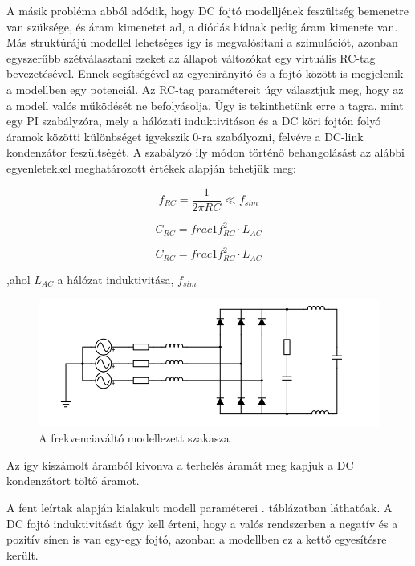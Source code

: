 A másik probléma abból adódik, hogy DC fojtó modelljének feszültség bemenetre van szüksége, és áram kimenetet ad, a diódás hídnak pedig áram kimenete van. Más struktúrájú modellel lehetséges így is megvalósítani a szimulációt, azonban egyszerűbb szétválasztani ezeket az állapot változókat egy virtuális RC-tag bevezetésével. Ennek segítségével az egyenirányító és a fojtó között is megjelenik a modellben egy potenciál. Az RC-tag paramétereit úgy választjuk meg, hogy az a modell valós működését ne befolyásolja. Úgy is tekinthetünk erre a tagra, mint egy PI szabályzóra, mely a hálózati induktivitáson és a DC köri fojtón folyó áramok közötti különbséget igyekszik $0$-ra szabályozni, felvéve a DC-link kondenzátor feszültségét. A szabályzó ily módon történő behangolásást az alábbi egyenletekkel meghatározott értékek alapján tehetjük meg:

\begin{equation}
f_{RC} = \frac{1}{2\pi{}RC} \ll f_{sim}
\end{equation}

\begin{equation}
C_{RC} = frac{1}{f_{RC}^2\cdot{}L_{AC}}
\end{equation}

\begin{equation}
C_{RC} = frac{1}{f_{RC}^2\cdot{}L_{AC}}
\end{equation}

,ahol $L_{AC}$ a hálózat induktivitása, $f_{sim}$

\begin{figure}[H!]
	\centering
	\includegraphics[width = \textwidth]{figures/VFD_virtual_RC.png}
	\caption{A frekvenciaváltó modellezett szakasza} 
	\label{fig:virtualRC}
\end{figure}

Az így kiszámolt áramból kivonva a terhelés áramát meg kapjuk a DC kondenzátort töltő áramot.

A fent leírtak alapján kialakult modell paraméterei . táblázatban láthatóak. A DC fojtó induktivitását úgy kell érteni, hogy a valós rendszerben a negatív és a pozitív sínen is van egy-egy fojtó, azonban a modellben ez a kettő egyesítésre került.

